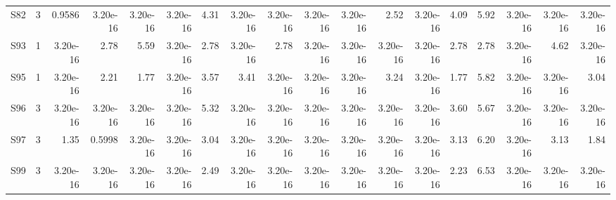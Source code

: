 \begin{table}[htbp]
{\begin{tabular}{lrrrrrrrrrrrrrrrrr}
    S82 & 3 & 0.9586 & 3.20e-16 & 3.20e-16 & 3.20e-16 & 4.31 & 3.20e-16 & 3.20e-16 & 3.20e-16 & 3.20e-16 & 2.52 & 3.20e-16 & 4.09 & 5.92 & 3.20e-16 & 3.20e-16 & 3.20e-16 \\
    S93 & 1 & 3.20e-16 & 2.78 & 5.59 & 3.20e-16 & 2.78 & 3.20e-16 & 2.78 & 3.20e-16 & 3.20e-16 & 3.20e-16 & 3.20e-16 & 2.78 & 2.78 & 3.20e-16 & 4.62 & 3.20e-16 \\
    S95 & 1 & 3.20e-16 & 2.21 & 1.77 & 3.20e-16 & 3.57 & 3.41 & 3.20e-16 & 3.20e-16 & 3.20e-16 & 3.24 & 3.20e-16 & 1.77 & 5.82 & 3.20e-16 & 3.20e-16 & 3.04 \\
    S96 & 3 & 3.20e-16 & 3.20e-16 & 3.20e-16 & 3.20e-16 & 5.32 & 3.20e-16 & 3.20e-16 & 3.20e-16 & 3.20e-16 & 3.20e-16 & 3.20e-16 & 3.60 & 5.67 & 3.20e-16 & 3.20e-16 & 3.20e-16 \\
    S97 & 3 & 1.35 & 0.5998 & 3.20e-16 & 3.20e-16 & 3.04 & 3.20e-16 & 3.20e-16 & 3.20e-16 & 3.20e-16 & 3.20e-16 & 3.20e-16 & 3.13 & 6.20 & 3.20e-16 & 3.13 & 1.84 \\
    S99 & 3 & 3.20e-16 & 3.20e-16 & 3.20e-16 & 3.20e-16 & 2.49 & 3.20e-16 & 3.20e-16 & 3.20e-16 & 3.20e-16 & 3.20e-16 & 3.20e-16 & 2.23 & 6.53 & 3.20e-16 & 3.20e-16 & 3.20e-16 \\
    \bottomrule
  \end{tabular}
  }
\end{table}
